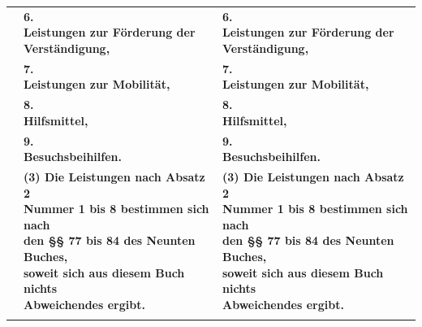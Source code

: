 \documentclass[10pt,a4paper,landscape]{article}
\begin{document}
\begin{longtable}{|L{8.2cm}|L{8.2cm}|L{8.2cm}|}
\hhline{|---|}
 & \textbf{6.   \newline Leistungen zur Förderung der  \newline Verständigung, } & \textbf{6.   \newline Leistungen zur Förderung der  \newline Verständigung, } \\
\hhline{|---|}
 & \textbf{7.   \newline Leistungen zur Mobilität, } & \textbf{7.   \newline Leistungen zur Mobilität, } \\
\hhline{|---|}
 & \textbf{8.   \newline Hilfsmittel, } & \textbf{8.   \newline Hilfsmittel, } \\
\hhline{|---|}
 & \textbf{9.   \newline Besuchsbeihilfen. } & \textbf{9.   \newline Besuchsbeihilfen. } \\
\hhline{|---|}
 & \textbf{(3) Die Leistungen nach Absatz 2  \newline Nummer 1 bis 8 bestimmen sich nach  \newline den \S{}\S{} 77 bis 84 des Neunten Buches,  \newline soweit sich aus diesem Buch nichts  \newline Abweichendes ergibt. } & \textbf{(3) Die Leistungen nach Absatz 2  \newline Nummer 1 bis 8 bestimmen sich nach  \newline den \S{}\S{} 77 bis 84 des Neunten Buches,  \newline soweit sich aus diesem Buch nichts  \newline Abweichendes ergibt. } \\
\hhline{|---|}

\end{longtable}
\end{document}
